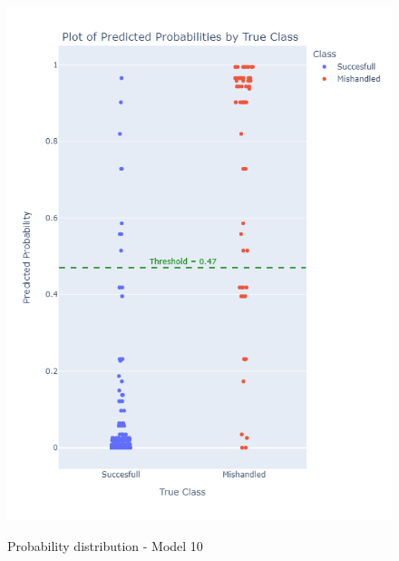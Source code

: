 \documentclass[12pt]{article}
\begin{document}
\begin{figure}
\begin{minipage}[c]{0.4\linewidth}
    \includegraphics[width=1\textwidth]{Probability_distribution_Model 10.png}\\
    \caption{Probability distribution - Model 10}
    \label{fig:Probability distribution - Model 10}
\end{minipage}
\end{figure}
\FloatBarrier
\end{document}
